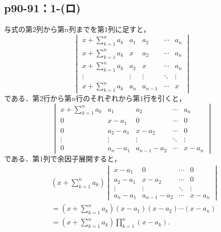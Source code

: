 \documentclass[a4paper,10pt,fleqn]{ltjsarticle}
\begin{document}
\subsection*{p90-91：1-(ロ)}

\begin{tleftbar}
    与式の第$2$列から第$n$列までを第$1$列に足すと，
    \[
        \begin{vmatrix}
            x+\sum_{k=1}^{n} a_k & a_1    & a_2     & \cdots & a_n    \\
            x+\sum_{k=1}^{n} a_k & x      & a_2     & \cdots & a_n    \\
            x+\sum_{k=1}^{n} a_k & a_2    & x       & \cdots & a_n    \\
            \vdots               & \vdots & \vdots  & \ddots & \vdots \\
            x+\sum_{k=1}^{n} a_k & a_n    & a_{n-1} & \cdots & x
        \end{vmatrix}
    \]
    である．第$2$行から第$n$行のそれぞれから第$1$行を引くと，
    \[
        \begin{vmatrix}
            x+\sum_{k=1}^{n} a_k & a_1      & a_2         & \cdots & a_n    \\
            0                    & x-a_1    & 0           & \cdots & 0      \\
            0                    & a_2 -a_1 & x-a_2       & \cdots & 0      \\
            \vdots               & \vdots   & \vdots      & \ddots & \vdots \\
            0                    & a_n-a_1  & a_{n-1}-a_2 & \cdots & x-a_n
        \end{vmatrix}
    \]
    である．第$1$列で余因子展開すると，
    \begin{align*}
         &
        (x+\sum_{k=1}^{n} a_k)
        \begin{vmatrix}
            x-a_1    & 0           & \cdots & 0      \\
            a_2 -a_1 & x-a_2       & \cdots & 0      \\
            \vdots   & \vdots      & \ddots & \vdots \\
            a_n-a_1  & a_{n-1}-a_2 & \cdots & x-a_n
        \end{vmatrix}
        \\
         & = (x+\sum_{k=1}^{n} a_k) (x-a_1)(x-a_2) \dotsm (x-a_n) \\
         & = (x+\sum_{k=1}^{n} a_k) \prod_{k=1}^{n} (x-a_k).
    \end{align*}
\end{tleftbar}
\newpage
\end{document}
